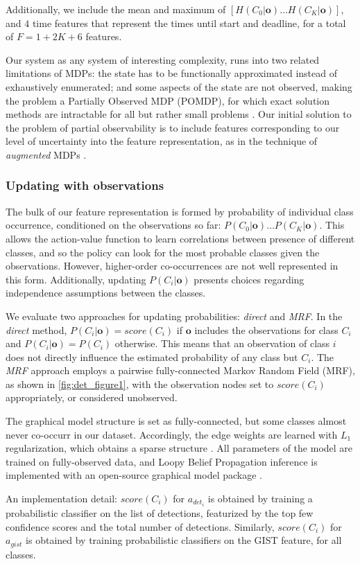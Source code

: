 Additionally, we include the mean and maximum of $[H(C_0|\mathbf{o}) \ldots H(C_K|\mathbf{o})]$, and $4$ time features that represent the times until start and deadline, for a total of $F = 1+2K+6$ features.

Our system as any system of interesting complexity, runs into two related limitations of MDPs: the state has to be functionally approximated instead of exhaustively enumerated; and some aspects of the state are not observed, making the problem a Partially Observed MDP (POMDP), for which exact solution methods are intractable for all but rather small problems \parencite{Roy2002}.
Our initial solution to the problem of partial observability is to include features corresponding to our level of uncertainty into the feature representation, as in the technique of \emph{augmented} MDPs \parencite{Kwok2004}.

\subsubsection{Updating with observations}\label{sec:det_features_updating}

The bulk of our feature representation is formed by probability of individual class occurrence, conditioned on the observations so far: $P(C_0|\mathbf{o}) \ldots P(C_K|\mathbf{o})$.
This allows the action-value function to learn correlations between presence of different classes, and so the policy can look for the most probable classes given the observations.
However, higher-order co-occurrences are not well represented in this form.
Additionally, updating $P(C_i|\mathbf{o})$ presents choices regarding independence assumptions between the classes.

We evaluate two approaches for updating probabilities: \emph{direct} and \emph{MRF}.
In the \emph{direct} method, $P(C_i|\mathbf{o}) = score(C_i)$ if $\mathbf{o}$ includes the observations for class $C_i$ and $P(C_i|\mathbf{o}) = P(C_i)$ otherwise.
This means that an observation of class $i$ does not directly influence the estimated probability of any class but $C_i$.
The \emph{MRF} approach employs a pairwise fully-connected Markov Random Field (MRF), as shown in \autoref{fig:det_figure1}, with the observation nodes set to $score(C_i)$ appropriately, or considered unobserved.

The graphical model structure is set as fully-connected, but some classes almost never co-occurr in our dataset.
Accordingly, the edge weights are learned with $L_1$ regularization, which obtains a sparse structure \parencite{Lee2006}.
All parameters of the model are trained on fully-observed data, and Loopy Belief Propagation inference is implemented with an open-source graphical model package \parencite{Jaimovich2010}.

An implementation detail: $score(C_i)$ for $a_{{det}_i}$ is obtained by training a probabilistic classifier on the list of detections, featurized by the top few confidence scores and the total number of detections.
Similarly, $score(C_i)$ for $a_{gist}$ is obtained by training probabilistic classifiers on the GIST feature, for all classes.
